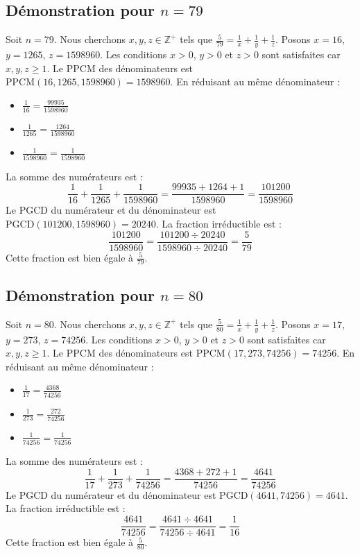 \documentclass[11pt,a4paper]{article}
\begin{document}
\subsection{Démonstration pour $n = 79$}
Soit $n = 79$. Nous cherchons $x, y, z \in \mathbb{Z}^{+}$ tels que $\frac{5}{79} = \frac{1}{x} + \frac{1}{y} + \frac{1}{z}$.
Posons $x = 16$, $y = 1265$, $z = 1598960$.
Les conditions $x > 0$, $y > 0$ et $z > 0$ sont satisfaites car $x, y, z \geq 1$.
Le PPCM des dénominateurs est $\text{PPCM}(16, 1265, 1598960) = 1598960$.
En réduisant au même dénominateur :
\begin{itemize}
    \item $\frac{1}{16} = \frac{99935}{1598960}$
    \item $\frac{1}{1265} = \frac{1264}{1598960}$
    \item $\frac{1}{1598960} = \frac{1}{1598960}$
\end{itemize}
La somme des numérateurs est :
$$ \frac{1}{16} + \frac{1}{1265} + \frac{1}{1598960} = \frac{99935 + 1264 + 1}{1598960} = \frac{101200}{1598960} $$
Le PGCD du numérateur et du dénominateur est $\text{PGCD}(101200, 1598960) = 20240$.
La fraction irréductible est :
$$ \frac{101200}{1598960} = \frac{101200 \div 20240}{1598960 \div 20240} = \frac{5}{79} $$
Cette fraction est bien égale à $\frac{5}{79}$.

\subsection{Démonstration pour $n = 80$}
Soit $n = 80$. Nous cherchons $x, y, z \in \mathbb{Z}^{+}$ tels que $\frac{5}{80} = \frac{1}{x} + \frac{1}{y} + \frac{1}{z}$.
Posons $x = 17$, $y = 273$, $z = 74256$.
Les conditions $x > 0$, $y > 0$ et $z > 0$ sont satisfaites car $x, y, z \geq 1$.
Le PPCM des dénominateurs est $\text{PPCM}(17, 273, 74256) = 74256$.
En réduisant au même dénominateur :
\begin{itemize}
    \item $\frac{1}{17} = \frac{4368}{74256}$
    \item $\frac{1}{273} = \frac{272}{74256}$
    \item $\frac{1}{74256} = \frac{1}{74256}$
\end{itemize}
La somme des numérateurs est :
$$ \frac{1}{17} + \frac{1}{273} + \frac{1}{74256} = \frac{4368 + 272 + 1}{74256} = \frac{4641}{74256} $$
Le PGCD du numérateur et du dénominateur est $\text{PGCD}(4641, 74256) = 4641$.
La fraction irréductible est :
$$ \frac{4641}{74256} = \frac{4641 \div 4641}{74256 \div 4641} = \frac{1}{16} $$
Cette fraction est bien égale à $\frac{5}{80}$.
\end{document}
